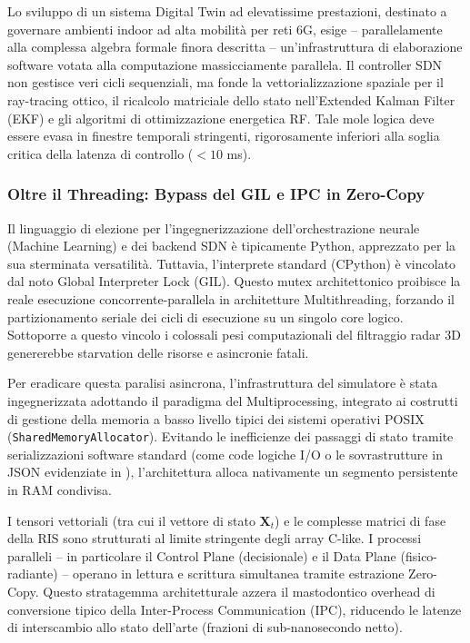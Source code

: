 \documentclass[twoside]{article}
\begin{document}
Lo sviluppo di un sistema Digital Twin ad elevatissime prestazioni, destinato a governare ambienti indoor ad alta mobilità per reti 6G, esige -- parallelamente alla complessa algebra formale finora descritta -- un'infrastruttura di elaborazione software votata alla computazione massicciamente parallela. Il controller SDN non gestisce veri cicli sequenziali, ma fonde la vettorializzazione spaziale per il ray-tracing ottico, il ricalcolo matriciale dello stato nell'Extended Kalman Filter (EKF) e gli algoritmi di ottimizzazione energetica RF. Tale mole logica deve essere evasa in finestre temporali stringenti, rigorosamente inferiori alla soglia critica della latenza di controllo ($< 10$ ms).

\subsubsection{Oltre il Threading: Bypass del GIL e IPC in Zero-Copy}

Il linguaggio di elezione per l'ingegnerizzazione dell'orchestrazione neurale (Machine Learning) e dei backend SDN è tipicamente Python, apprezzato per la sua sterminata versatilità. Tuttavia, l'interprete standard (CPython) è vincolato dal noto Global Interpreter Lock (GIL). Questo mutex architettonico proibisce la reale esecuzione concorrente-parallela in architetture Multithreading, forzando il partizionamento seriale dei cicli di esecuzione su un singolo core logico. Sottoporre a questo vincolo i colossali pesi computazionali del filtraggio radar 3D genererebbe starvation delle risorse e asincronie fatali.

Per eradicare questa paralisi asincrona, l'infrastruttura del simulatore è stata ingegnerizzata adottando il paradigma del Multiprocessing, integrato ai costrutti di gestione della memoria a basso livello tipici dei sistemi operativi POSIX (\texttt{SharedMemoryAllocator}). Evitando le inefficienze dei passaggi di stato tramite serializzazioni software standard (come code logiche I/O o le sovrastrutture in JSON evidenziate in \cite{Vairam2023}), l'architettura alloca nativamente un segmento persistente in RAM condivisa.

I tensori vettoriali (tra cui il vettore di stato $\mathbf{X}_t$) e le complesse matrici di fase della RIS sono strutturati al limite stringente degli array C-like. I processi paralleli -- in particolare il Control Plane (decisionale) e il Data Plane (fisico-radiante) -- operano in lettura e scrittura simultanea tramite estrazione Zero-Copy. Questo stratagemma architetturale azzera il mastodontico overhead di conversione tipico della Inter-Process Communication (IPC), riducendo le latenze di interscambio allo stato dell'arte (frazioni di sub-nanosecondo netto).
\end{document}
